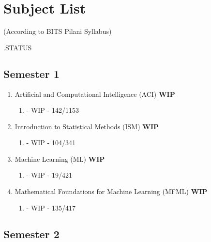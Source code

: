 \chapter*{Subject List}

\begin{center}
(According to BITS Pilani Syllabus)
\end{center}

.\hfill STATUS

\section*{Semester 1}
\begin{enumerate}
    \item Artificial and Computational Intelligence (ACI)
        \hfill \textbf{WIP}
    \begin{enumerate}
        \item \cite{ai/book/Artificial-Intelligence-A-Modern-Approach/Russell-Norvig} - WIP - 142/1153
    \end{enumerate}
    \item Introduction to Statistical Methods (ISM)    
        \hfill \textbf{WIP}
    \begin{enumerate}
        \item \cite{statistics/book/Statistics-for-Data-Scientists/Maurits-Kaptein} - WIP - 104/341
    \end{enumerate}
    \item Machine Learning (ML)
        \hfill \textbf{WIP}
    \begin{enumerate}
        \item \cite{ml/book/Machine-Learning/Tom-M-Mitchell} - WIP - 19/421
    \end{enumerate}
    \item Mathematical Foundations for Machine Learning (MFML)
        \hfill \textbf{WIP}
    \begin{enumerate}
        \item \cite{mfml/book/mml/Deisenroth-Faisal-Ong} - WIP - 135/417
    \end{enumerate}
\end{enumerate}


\section*{Semester 2}

